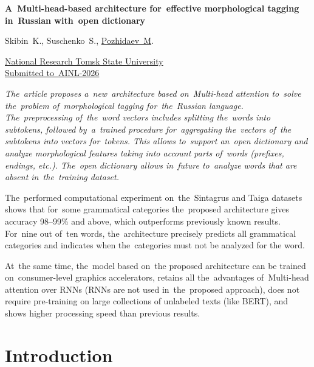 \documentclass[11pt,twocolumn]{article}
\newcommand {\titlefont} {\Large \bf \sffamily}
\newcommand {\authorfont} {\large \sffamily}
\newcommand {\publisherfont} {\normalsize \sffamily}
\newcommand {\abstractfont} {\normalsize \it}
\begin{document}
\sloppy
\large

\begin{center}
  {\titlefont
    A~Multi-head-based architecture for~effective morphological tagging in~Russian with~open dictionary
  }

  {\authorfont
    Skibin~K.,
    Suschenko~S., %
    \href{https://marigostra.com}{Pozhidaev~M}.
  }

  \vspace{0.5cm}

  {\publisherfont
    \href{https://en.tsu.ru/}{National Research Tomsk State University}\\
    \href{https://ainlconf.ru}{Submitted to~AINL-2026}\\
      }

  \end{center}

  \vspace{0.5cm}

  {\abstractfont
  The~article proposes a~new~architecture based on~Multi-head attention to~solve the~problem of~morphological tagging for~the~Russian language.
  The~preprocessing of~the~word vectors includes splitting the~words into subtokens, followed by~a~trained procedure for~aggregating the~vectors of~the subtokens into vectors for~tokens.
  This allows to~support an~open dictionary and analyze morphological features taking into account parts of~words (prefixes, endings, etc.).
  The~open dictionary allows in~future to~analyze words that are absent in~the~training dataset.
  

The~performed computational experiment on~the~Sintagrus and Taiga datasets shows that for~some grammatical categories
the~proposed architecture gives accuracy 98--99\% and above, which outperforms previously known results.
For~nine out of~ten words, the~architecture precisely predicts all grammatical categories and indicates when the~categories must not be analyzed for the word.

At~the same time, the~model based on~the proposed architecture can be trained on~consumer-level graphics accelerators,
retains all the~advantages of~Multi-head attention over RNNs (RNNs are not used in~the~proposed approach),
does not require pre-training on large collections of unlabeled texts (like BERT),
and shows higher processing speed than previous results.
  }

  \section*{Introduction}
\end{document}
